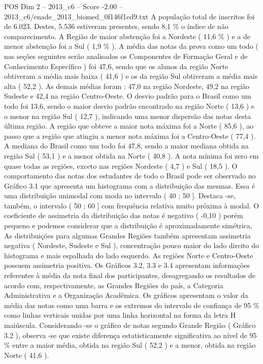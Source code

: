 \begin{textsample}{POS Dim 2 – 2013\_c6 – Score -2.00 – 2013\_c6/enade\_2013\_biomed\_0f146f1ed9.txt}
A população total de inscritos foi de 6.023.
Destes, 5.536 estiveram presentes, sendo 8,1 \% o índice de não comparecimento.
A Região de maior abstenção foi a Nordeste ( 11,6 \% ) e a de menor abstenção foi a Sul ( 1,9 \% ).
A média das notas da prova como um todo ( nas seções seguintes serão analisados os Componentes de Formação Geral e de Conhecimento Específico ) foi 47,6, sendo que os alunos da região Norte obtiveram a média mais baixa ( 41,6 ) e os da região Sul obtiveram a média mais alta ( 52,2 ).
As demais médias foram : 47,0 na região Nordeste, 49,2 na região Sudeste e 42,4 na região Centro-Oeste.
O desvio padrão para o Brasil como um todo foi 13,6, sendo o maior desvio padrão encontrado na região Norte ( 13,6 ) e o menor na região Sul ( 12,7 ), indicando uma menor dispersão das notas desta última região.
A região que obteve a maior nota máxima foi a Norte ( 85,6 ), ao passo que a região que atingiu a menor nota máxima foi a Centro-Oeste ( 77,4 ).
A mediana do Brasil como um todo foi 47,8, sendo a maior mediana obtida na região Sul ( 53,1 ) e a menor obtida na Norte ( 40,8 ).
A nota mínima foi zero em quase todas as regiões, exceto nas regiões Nordeste ( 4,7 ) e Sul ( 18,5 ).
O comportamento das notas dos estudantes de todo o Brasil pode ser observado no Gráfico 3.1 que apresenta um histograma com a distribuição das mesmas.
Essa é uma distribuição unimodal com moda no intervalo ( 40 ; 50 ].
Destaca -se, também, o intervalo ( 50 ; 60 ] com frequência relativa muito próxima à modal.
O coeficiente de assimetria da distribuição das notas é negativo ( -0,10 ) porém pequeno e podemos considerar que a distribuição é aproximadamente simétrica.
As distribuições para algumas Grandes Regiões também apresentam assimetria negativa ( Nordeste, Sudeste e Sul ), concentração pouco maior do lado direito do histograma e mais espalhada do lado esquerdo.
As regiões Norte e Centro-Oeste possuem assimetria positiva.
Os Gráficos 3.2, 3.3 e 3.4 apresentam informações referentes à média da nota final dos participantes, desagregando os resultados de acordo com, respectivamente, as Grandes Regiões do país, a Categoria Administrativa e a Organização Acadêmica.
Os gráficos apresentam o valor da média das notas como uma barra e os extremos do intervalo de confiança de 95 \% como linhas verticais unidas por uma linha horizontal na forma da letra H maiúscula.
Considerando -se o gráfico de notas segundo Grande Região ( Gráfico 3.2 ), observa -se que existe diferença estatisticamente significativa ao nível de 95 \% entre a maior média, obtida na região Sul ( 52,2 ) e a menor, obtida na região Norte ( 41,6 ).

\end{textsample}
